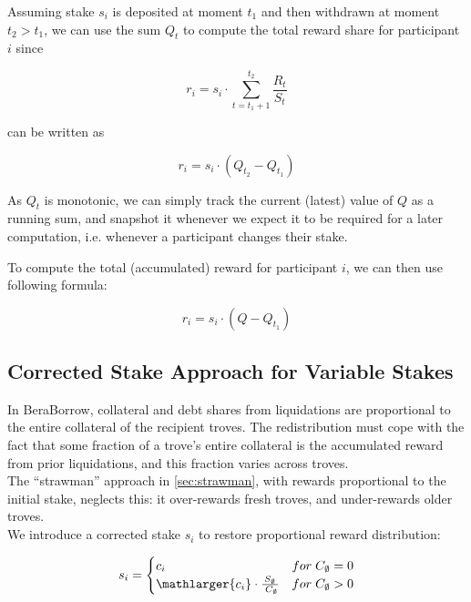 \documentclass[reqno]{article}
\begin{document}
Assuming stake $s_i$ is deposited at moment $t_1$ and then
withdrawn at moment $t_2 > t_1$, we can use the sum $Q_t$ to
compute the total reward share for participant $i$ since


\begin{equation} 
    r_i = s_i \cdot \sum\limits_{t=t_1+1}^{t_2}\frac{R_t}{S_t}
\end{equation}

can be written as

\begin{equation} 
    r_i = s_i \cdot (Q_{t_2} - Q_{t_1})
\end{equation}

As $Q_t$ is monotonic, we can simply track the current (latest)
value of $Q$ as a running sum, and snapshot it whenever we expect it to be required for a later computation, i.e. whenever a participant changes their stake.

To compute the total (accumulated) reward for participant $i$, we can then use following formula:

\begin{equation} 
    r_i = s_i \cdot (Q - Q_{t_1})
\end{equation}

\bigskip

\subsection{Corrected Stake Approach for Variable Stakes}
In BeraBorrow, collateral and debt shares from liquidations are proportional to the entire collateral of the recipient troves. The redistribution must cope with the fact that some fraction of a trove's entire collateral is the accumulated reward from prior liquidations, and this fraction varies across troves. \\

The “strawman” approach in \ref{sec:strawman}, with rewards proportional to the initial stake, neglects this: it over-rewards fresh troves, and under-rewards older troves. \\

We introduce a corrected stake $s_i$ to restore proportional reward distribution:

\begin{equation} \label{eq:2}
    s_i=
        \begin{cases} 
            c_i & for \;C_\emptyset = 0\\
            \mathlarger{c_i} \cdot \frac{S_\emptyset} {\;C_\emptyset} & for \;C_\emptyset>0
        \end{cases}
\end{equation}
\end{document}
